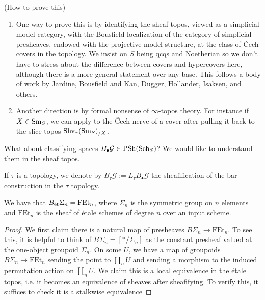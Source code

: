 \documentclass[11pt,openany]{book}
\renewcommand{\Pre}{\mathrm{PSh}}
\providecommand{\FEt}{\mathrm{FEt}}
\begin{document}
\begin{remark} (How to prove this)
\begin{enumerate}
    \item  One way to prove this is by identifying the sheaf topos, viewed as a simplicial model category, with the Bousfield localization of the category of simplicial presheaves, endowed with the projective model structure, at the class of \v{C}ech covers in the topology. We insist on $S$ being qcqs and Noetherian so we don't have to stress about the difference between covers and hypercovers here, although there is a more general statement over any base. This follows a body of work by Jardine, Bousfield and Kan, Dugger, Hollander, Isaksen, and others.
    \item Another direction is by formal nonsense of $\infty$-topos theory. For instance if $X\in \mathrm{Sm}_S$, we can apply \cite[A.5.3.1]{SAG} to the \v{C}ech nerve of a cover after pulling it back to the slice topos $\mathrm{Shv}_{\tau}(\mathrm{Sm}_S)_{/X}$.
\end{enumerate}

\end{remark}

What about classifying spaces $B_{\bullet}\mathcal{G}\in \Pre(\Sch_S)$? We would like to understand them in the sheaf topos.

\begin{notation} If $\tau$ is a topology, we denote by $B_\tau \mathcal{G} := L_\tau B_\bullet \mathcal{G}$ the sheafification of the bar construction in the $\tau$ topology.
\end{notation}

\begin{example} We have that $B_\et \Sigma_n = \FEt_n$, where $\Sigma_n$ is the symmetric group on $n$ elements and $\FEt_n$ is the sheaf of \'etale schemes of degree $n$ over an input scheme.
\end{example}
\begin{proof} We first claim there is a natural map of presheaves $B\Sigma_n \to \FEt_n$. To see this, it is helpful to think of $B\Sigma_n = [\ast/\Sigma_n]$ as the constant presheaf valued at the one-object groupoid $\Sigma_n$. On some $U$, we have a map of groupoids $B\Sigma_n \to \FEt_n$ sending the point to $\amalg_n U$ and sending a morphism to the induced permutation action on $\amalg_n U$. We claim this is a local equivalence in the \'etale topos, i.e. it becomes an equivalence of sheaves after sheafifying. To verify this, it suffices to check it is a stalkwise equivalence
\end{proof}
\end{document}

